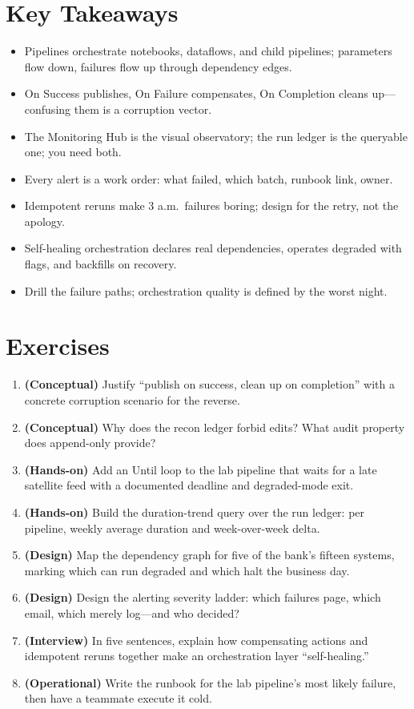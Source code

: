 \section*{Key Takeaways}
\begin{itemize}
    \item Pipelines orchestrate notebooks, dataflows, and child pipelines; parameters flow down, failures flow up through dependency edges.
    \item On Success publishes, On Failure compensates, On Completion cleans up---confusing them is a corruption vector.
    \item The Monitoring Hub is the visual observatory; the run ledger is the queryable one; you need both.
    \item Every alert is a work order: what failed, which batch, runbook link, owner.
    \item Idempotent reruns make 3 a.m.\ failures boring; design for the retry, not the apology.
    \item Self-healing orchestration declares real dependencies, operates degraded with flags, and backfills on recovery.
    \item Drill the failure paths; orchestration quality is defined by the worst night.
\end{itemize}

\section{Exercises}
\begin{enumerate}
    \item \textbf{(Conceptual)} Justify ``publish on success, clean up on completion'' with a concrete corruption scenario for the reverse.
    \item \textbf{(Conceptual)} Why does the recon ledger forbid edits? What audit property does append-only provide?
    \item \textbf{(Hands-on)} Add an Until loop to the lab pipeline that waits for a late satellite feed with a documented deadline and degraded-mode exit.
    \item \textbf{(Hands-on)} Build the duration-trend query over the run ledger: per pipeline, weekly average duration and week-over-week delta.
    \item \textbf{(Design)} Map the dependency graph for five of the bank's fifteen systems, marking which can run degraded and which halt the business day.
    \item \textbf{(Design)} Design the alerting severity ladder: which failures page, which email, which merely log---and who decided?
    \item \textbf{(Interview)} In five sentences, explain how compensating actions and idempotent reruns together make an orchestration layer ``self-healing.''
    \item \textbf{(Operational)} Write the runbook for the lab pipeline's most likely failure, then have a teammate execute it cold.
\end{enumerate}

